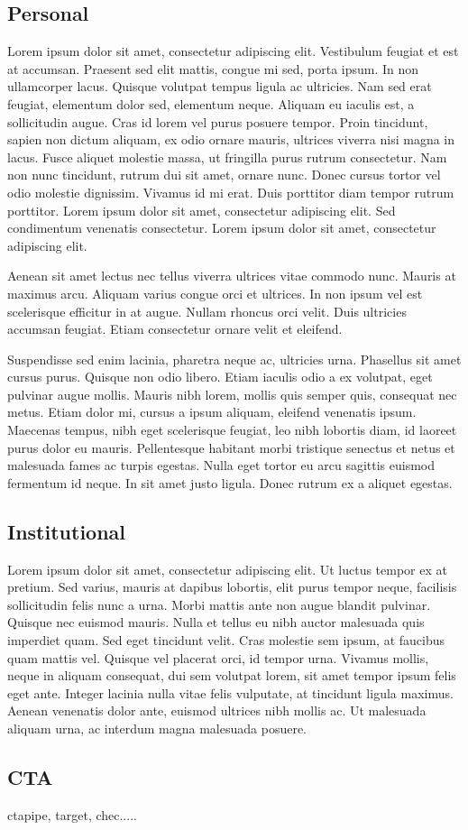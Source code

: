 \subsection*{Personal}

Lorem ipsum dolor sit amet, consectetur adipiscing elit. Vestibulum feugiat et est at accumsan. Praesent sed elit mattis, congue mi sed, porta ipsum. In non ullamcorper lacus. Quisque volutpat tempus ligula ac ultricies. Nam sed erat feugiat, elementum dolor sed, elementum neque. Aliquam eu iaculis est, a sollicitudin augue. Cras id lorem vel purus posuere tempor. Proin tincidunt, sapien non dictum aliquam, ex odio ornare mauris, ultrices viverra nisi magna in lacus. Fusce aliquet molestie massa, ut fringilla purus rutrum consectetur. Nam non nunc tincidunt, rutrum dui sit amet, ornare nunc. Donec cursus tortor vel odio molestie dignissim. Vivamus id mi erat. Duis porttitor diam tempor rutrum porttitor. Lorem ipsum dolor sit amet, consectetur adipiscing elit. Sed condimentum venenatis consectetur. Lorem ipsum dolor sit amet, consectetur adipiscing elit.

Aenean sit amet lectus nec tellus viverra ultrices vitae commodo nunc. Mauris at maximus arcu. Aliquam varius congue orci et ultrices. In non ipsum vel est scelerisque efficitur in at augue. Nullam rhoncus orci velit. Duis ultricies accumsan feugiat. Etiam consectetur ornare velit et eleifend.

Suspendisse sed enim lacinia, pharetra neque ac, ultricies urna. Phasellus sit amet cursus purus. Quisque non odio libero. Etiam iaculis odio a ex volutpat, eget pulvinar augue mollis. Mauris nibh lorem, mollis quis semper quis, consequat nec metus. Etiam dolor mi, cursus a ipsum aliquam, eleifend venenatis ipsum. Maecenas tempus, nibh eget scelerisque feugiat, leo nibh lobortis diam, id laoreet purus dolor eu mauris. Pellentesque habitant morbi tristique senectus et netus et malesuada fames ac turpis egestas. Nulla eget tortor eu arcu sagittis euismod fermentum id neque. In sit amet justo ligula. Donec rutrum ex a aliquet egestas.

\subsection*{Institutional}

Lorem ipsum dolor sit amet, consectetur adipiscing elit. Ut luctus tempor ex at pretium. Sed varius, mauris at dapibus lobortis, elit purus tempor neque, facilisis sollicitudin felis nunc a urna. Morbi mattis ante non augue blandit pulvinar. Quisque nec euismod mauris. Nulla et tellus eu nibh auctor malesuada quis imperdiet quam. Sed eget tincidunt velit. Cras molestie sem ipsum, at faucibus quam mattis vel. Quisque vel placerat orci, id tempor urna. Vivamus mollis, neque in aliquam consequat, dui sem volutpat lorem, sit amet tempor ipsum felis eget ante. Integer lacinia nulla vitae felis vulputate, at tincidunt ligula maximus. Aenean venenatis dolor ante, euismod ultrices nibh mollis ac. Ut malesuada aliquam urna, ac interdum magna malesuada posuere.



\subsection*{CTA}
ctapipe, target, chec.....